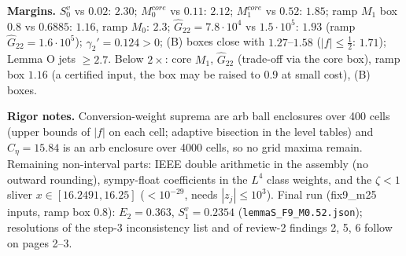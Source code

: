 \documentclass[11pt]{article}
\begin{document}
\noindent\textbf{Margins.} $S_0^v$ vs $0.02$: $2.30$; $M_0^{core}$ vs $0.11$: $2.12$; $M_1^{core}$ vs $0.52$: $\mathbf{1.85}$; ramp $M_1$ box $0.8$ vs $0.6885$: $1.16$, ramp $M_0$: $2.3$; $\hat G_{22}=7.8\cdot10^4$ vs $1.5\cdot10^5$: $1.93$ (ramp $\hat G_{22}=1.6\cdot10^5$); $\gamma_2'=0.124>0$; (B) boxes close with $1.27$--$1.58$ ($|f|\le\tfrac12$: $1.71$); Lemma O jets $\ge2.7$. Below $2\times$: core $M_1$, $\hat G_{22}$ (trade-off via the core box), ramp box $1.16$ (a certified input, the box may be raised to $0.9$ at small cost), (B) boxes.

\noindent\textbf{Rigor notes.} Conversion-weight suprema are arb ball enclosures over 400 cells (upper bounds of $|f|$ on each cell; adaptive bisection in the level tables) and $C_\eta=15.84$ is an arb enclosure over 4000 cells, so no grid maxima remain. Remaining non-interval parts: IEEE double arithmetic in the assembly (no outward rounding), sympy-float coefficients in the $L^4$ class weights, and the $\zeta<1$ sliver $x\in[16.2491,16.25]$ ($<10^{-29}$, needs $|z_j|\le10^3$). Final run (fix9\_m25 inputs, ramp box $0.8$): $E_2=0.363$, $S_1^v=0.2354$ (\texttt{lemmaS\_F9\_M0.52.json}); resolutions of the step-3 inconsistency list and of review-2 findings 2, 5, 6 follow on pages 2--3.
\normalsize\newpage
\end{document}
